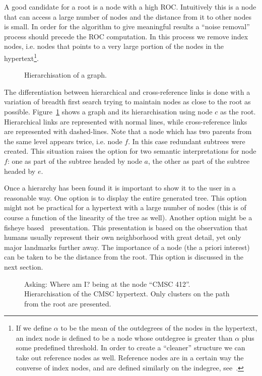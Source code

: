 \documentclass[twocolumn,10pt]{article}
\begin{document}
A good candidate for a root is a node with a high ROC. Intuitively this is a 
node that can access a large number of nodes and the distance from it to 
other nodes is small. In order for the algorithm to give meaningful results
a ``noise removal'' process should precede the ROC computation. In this 
process we remove index nodes, i.e. nodes that points to a very large portion
of the nodes in the hypertext\footnote{If we define $\alpha$ to be the mean of the outdegrees of the nodes
in the hypertext, an index node is defined to be a node whose outdegree is 
greater than $\alpha$ plus some predefined threshold. In order to create a
``cleaner'' structure we can take out reference nodes as well. Reference
nodes are in a certain way the converse of index nodes, and are defined 
similarly on the indegree, see~\cite{bot90}.}.

\begin{figure}
\vspace*{8cm}
\caption [10pt] { Hierarchisation of a graph.}
\label{fig:hier}
\end{figure}

The differentiation between hierarchical and cross-reference links is done
with a variation of breadth first search trying to maintain nodes as close to
the root as possible. Figure~\ref{fig:hier} shows a graph and its 
hierarchisation using 
node $c$ as the root. Hierarchical links are represented with normal lines, 
while cross-reference links are represented with dashed-lines. Note that a 
node which has two parents from the same level appears twice, i.e. node $f$.
In this case redundant subtrees were created. This situation raises the option
for two semantic interpretations for node $f$: one as part of the subtree
headed by node $a$, the other as part of the subtree headed by $e$.

Once a hierarchy has been found it is important to show it to the user
in a reasonable way. One option is to display the entire generated
tree.  This option might not be practical for a hypertext with a large
number of nodes (this is of course a function of the linearity of the
tree as well).  Another option might be a fisheye based~\cite{fur86}
presentation.  This presentation is based on the observation that
humans usually represent their own neighborhood with great detail, yet
only major landmarks further away. The importance of a node (the a
priori interest) can be taken to be the distance from the root. This
option is discussed in the next section.

\begin{figure}
\vspace*{7cm} 
\caption [10pt] { Asking: Where am I? being at the node ``CMSC 412''. 
Hierarchisation of the CMSC hypertext. Only 
clusters on the path from the root are presented.}
\label{fig:cmsc412}
\end{figure}
\end{document}
